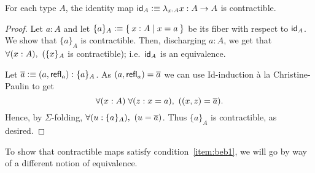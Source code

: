 \begin{lem}\label{lem:id-map}
For each type $A$, the identity map $\idfunc[A]\defeq \lambda_{x:A}x :A\ra A$ is contractible.
\end{lem}
\begin{proof}
  Let $a:A$ and let $\{a\}_A\defeq \setof{ x:A | x=a }$ be its fiber with respect to $\idfunc[A]$.
  We show that $\{ a\}_A$ is contractible.
  Then, discharging $a:A$, we get that $\fall{x:A} (\{ x\}_A$ is contractible); i.e.\ $\idfunc[A]$ is an equivalence.

  Let $\oa \defeq (a,\refl{a}):\{ a\}_A$.  As $(a,\refl{a}) = \oa$ we can use Id-induction \`{a} la Christine-Paulin to get
  \[\fall{x:A}{z:x=a} ((x,z)=\oa).\]
  Hence, by $\Sigma$-folding, $\fall{u:\{ a\}_A} (u=\oa)$.
  Thus $\{ a\}_A$ is contractible, as desired.
\end{proof}

To show that contractible maps satisfy condition~\ref{item:beb1}, we will go by way of a different notion of equivalence.





